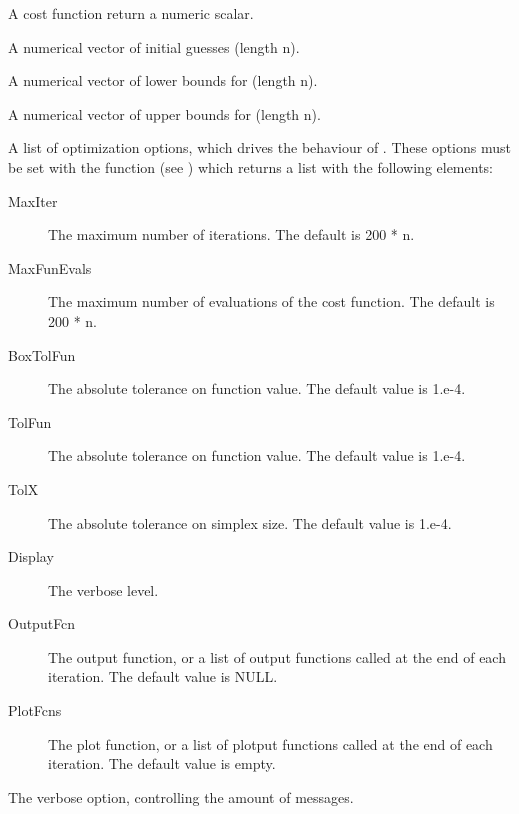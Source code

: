 \begin{Arguments}
\begin{ldescription}
\item[\code{fun}] A cost function return a numeric scalar.
\item[\code{x0}] A numerical vector of initial guesses (length n).
\item[\code{xmin}] A numerical vector of lower bounds for  (length n).
\item[\code{xmax}] A numerical vector of upper bounds for  (length n).
\item[\code{options}] A list of optimization options, which drives the behaviour of
. These options must be set with the 
function (see ) which returns a list with the following
elements: \begin{description}

\item[MaxIter] The maximum number of iterations. The default is 200 * n.
\item[MaxFunEvals] The maximum number of evaluations of the cost function.
The default is 200 * n.
\item[BoxTolFun] The absolute tolerance on function value. The default value
is 1.e-4.
\item[TolFun] The absolute tolerance on function value. The default value
is 1.e-4.
\item[TolX] The absolute tolerance on simplex size. The default value is
1.e-4.
\item[Display] The verbose level.
\item[OutputFcn] The output function, or a list of output functions
called at the end of each iteration. The default value is NULL.
\item[PlotFcns] The plot function, or a list of plotput functions called
at the end of each iteration. The default value is empty.

\end{description}


\item[\code{verbose}] The verbose option, controlling the amount of messages.
\end{ldescription}
\end{Arguments}
%
